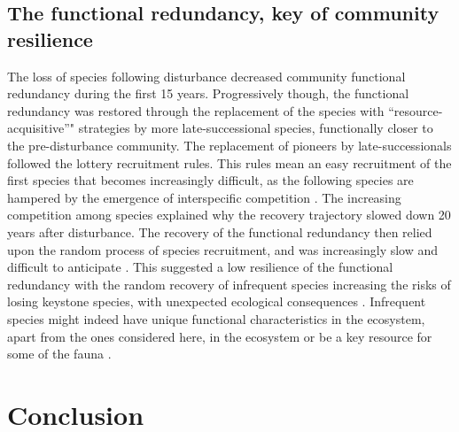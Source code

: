 \documentclass[fleqn,10pt]{ArtEcoFoG} %
\theoremstyle{definition}
\theoremstyle{definition}
\theoremstyle{definition}
\theoremstyle{remark}
\begin{document}
\subsection{The functional redundancy, key of community
resilience}\label{the-functional-redundancy-key-of-community-resilience}

The loss of species following disturbance decreased community functional
redundancy during the first 15 years. Progressively though, the
functional redundancy was restored through the replacement of the
species with ``resource-acquisitive''" strategies by more
late-successional species, functionally closer to the pre-disturbance
community. The replacement of pioneers by late-successionals followed
the lottery recruitment rules. This rules mean an easy recruitment of
the first species that becomes increasingly difficult, as the following
species are hampered by the emergence of interspecific competition
\citep{Busing2002}. The increasing competition among species explained
why the recovery trajectory slowed down 20 years after disturbance. The
recovery of the functional redundancy then relied upon the random
process of species recruitment, and was increasingly slow and difficult
to anticipate \citep{Elmqvist2003, Diaz2005}. This suggested a low
resilience of the functional redundancy with the random recovery of
infrequent species increasing the risks of losing keystone species, with
unexpected ecological consequences
\citep{Jones1994, Chazdon2003a, Diaz2005}. Infrequent species might
indeed have unique functional characteristics in the ecosystem, apart
from the ones considered here, in the ecosystem or be a key resource for
some of the fauna \citep{Schleuning2016}.

\section{Conclusion}\label{conclusion}
\end{document}
